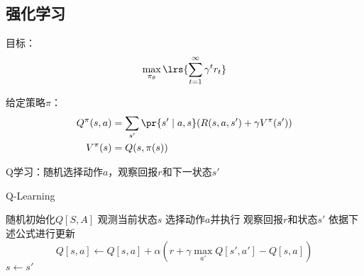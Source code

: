 \subsection{强化学习}
目标：
\[\max_{\pi_\theta}\lrs{\sum_{t=1}^\infty\gamma^tr_t}\]

给定策略$\pi$：
\[\begin{aligned}
Q^\pi(s,a) &= \sum_{s'}\pr{s'\mid a,s}(R(s,a,s')+\gamma V^\pi(s'))\\
V^\pi(s) &= Q(s,\pi(s))
\end{aligned}\]

Q学习：随机选择动作$a$，观察回报$r$和下一状态$s'$
\begin{algorithm}
\caption{Q-Learning}
\begin{algorithmic}[1]
\State 随机初始化$Q[S,A]$
\State 观测当前状态$s$
\Repeat
\State 选择动作$a$并执行
\State 观察回报$r$和状态$s'$
\State 依据下述公式进行更新
\[Q[s,a]\gets Q[s,a]+\alpha(r+\gamma\max_{a'}Q[s',a']-Q[s,a])\]
\State $s\gets s'$
\end{algorithmic}
\end{algorithm}